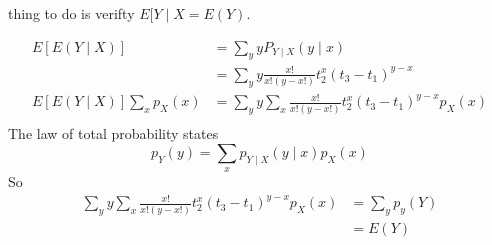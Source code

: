 \documentclass{tufte-book}
\theoremstyle{mytheoremstyle}
\theoremstyle{mylemstyle}
\theoremstyle{mydefstyle}
\begin{document}
\begin{enumerate}
 thing to do is verifty $E[Y\mid X = E(Y)$.

\begin{align*}
E[E(Y\mid X)]&= \sum_y yP_{Y\mid X}(y\mid x)\\
&= \sum_y y \frac{x!}{x!(y-x!)}t_2^x(t_3-t_1)^{y-x}\\
E[E(Y\mid X)] \sum_xp_X(x) &= \sum_y y \sum_x \frac{x!}{x!(y-x!)}t_2^x(t_3-t_1)^{y-x}p_X(x)\\
\end{align*}
The law of total probability states
\[ p_Y(y) = \sum_xp_{Y\mid X}(y \mid x) p_{X}(x) \]
So
\begin{align*}
\sum_y y \sum_x \frac{x!}{x!(y-x!)}t_2^x(t_3-t_1)^{y-x}p_X(x)&=\sum_y p_y(Y)\\
&= E(Y)\\
\end{align*}
\end{enumerate}
\end{document}
